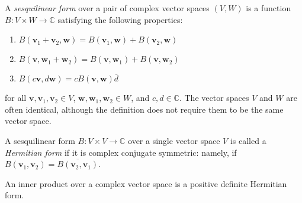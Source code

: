 \documentclass[12pt]{article}
\renewcommand{\v}{\mathbf{v}}
\newcommand{\w}{\mathbf{w}}
\begin{document}
A \emph{sesquilinear form} over a pair of complex vector spaces $(V,W)$ is a function $B\colon V \times W \to \mathbb{C}$ satisfying the following properties:
\begin{enumerate}
\item $B(\v_1+\v_2,\w) = B(\v_1,\w) + B(\v_2,\w)$
\item $B(\v,\w_1+\w_2) = B(\v,\w_1) + B(\v,\w_2)$
\item $B(c\v, d\w) = c B(\v,\w) \overline{d}$
\end{enumerate}
for all $\v,\v_1,\v_2 \in V$, $\w, \w_1, \w_2 \in W$, and $c,d \in \mathbb{C}$.  The vector spaces $V$ and $W$ are often identical, although the definition does not require them to be the same vector space.

A sesquilinear form $B\colon V \times V \to \mathbb{C}$ over a single vector space $V$ is called a \emph{Hermitian form} if it is complex conjugate symmetric: namely, if $B(\v_1,\v_2) = \overline{B(\v_2,\v_1)}$.

An inner product over a complex vector space is a positive definite Hermitian form.
\end{document}
